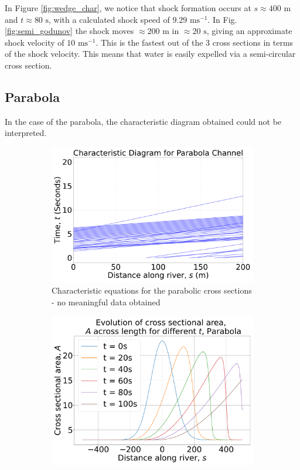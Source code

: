 \documentclass[12pt]{article}
\begin{document}
In Figure \ref{fig:wedge_char}, we notice that shock formation occurs at $s \approx 400\text{ m}$ and $t\approx 80\text{ s}$, with a calculated shock speed of $ 9.29\text{ ms}^{-1}$. In Fig. \ref{fig:semi_godunov} the shock moves $\approx200\text{ m}$ in $\approx 20 \text{ s}$, giving an approximate shock velocity of $ 10\text{ ms}^{-1}$. This is the fastest out of the 3 cross sections in terms of the shock velocity. This means that water is easily expelled via a semi-circular cross section.

\subsection{Parabola}
In the case of the parabola, the characteristic diagram obtained could not be interpreted. 
\begin{figure}[H]
    \centering
    \begin{subfigure}[b]{0.49\textwidth}
        \centering
        \includegraphics[width=\textwidth]{Figures/Parabola_characteristic.pdf}
        \caption{Characteristic equations for the parabolic cross sections - no meaningful data obtained}
        \label{fig:parab_char}
    \end{subfigure}
    \hfill
    \begin{subfigure}[b]{0.49\textwidth}
        \centering
        \includegraphics[width=\textwidth]{Figures/Parabola_godunov.pdf}

\end{subfigure}
\end{figure}
\end{document}

